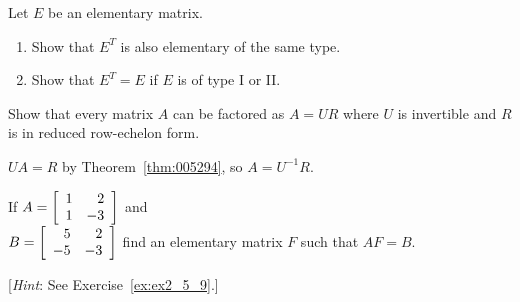 \begin{multicols}{2}
\begin{ex}
\begin{sol}
\begin{enumerate}[label={\alph*.}]
\end{enumerate}
\end{sol}
\end{ex}

\begin{ex} \label{ex:ex2_5_9}
Let $E$ be an elementary matrix.


\begin{enumerate}[label={\alph*.}]
\item Show that $E^{T}$ is also elementary of the same type.

\item Show that $E^{T} = E$ if $E$ is of type I or II.

\end{enumerate}
\end{ex}

\begin{ex}
Show that every matrix $A$ can be factored as $A = UR$ where $U$ is invertible and $R$ is in reduced row-echelon form.

\begin{sol}
$UA = R$ by Theorem~\ref{thm:005294}, so $A = U^{-1}R$.
\end{sol}
\end{ex}

\begin{ex}
If $A = \left[ \begin{array}{rr}
1 & 2 \\
1 & -3
\end{array} \right]$
 and \\ $B = \left[ \begin{array}{rr}
 5 & 2 \\
 -5 & -3
 \end{array} \right]$
 find an elementary matrix $F$ such that $AF = B$.


[\textit{Hint}: See Exercise~\ref{ex:ex2_5_9}.]
\end{ex}


\end{multicols}
